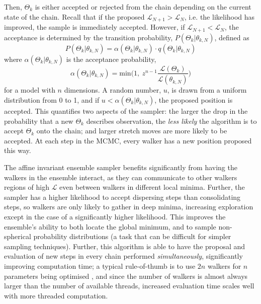 Then, $\Theta_k$ is either accepted or rejected from the chain depending on the current state of the chain. Recall that if the proposed $\mathcal{L}_{N+1} > \mathcal{L}_{N}$, i.e. the likelihood has improved, the sample is immediately accepted. However, if $\mathcal{L}_{N+1} < \mathcal{L}_{N}$, the acceptance is determined by the transition probability, $P(\Theta_k | \theta_{k,N})$, defined as
\begin{equation}
    P(\Theta_k | \theta_{k,N}) = \alpha(\Theta_k | \theta_{k,N}) \cdot q(\Theta_k | \theta_{k,N})
\end{equation}
where $\alpha(\Theta_k | \theta_{k,N})$ is the acceptance probability,
\begin{equation}
    \alpha(\Theta_k | \theta_{k,N}) = \mathrm{min}\bigg( 1,\ z^{n-1}\frac{\mathcal{L}(\Theta_k)}{\mathcal{L}(\theta_{k,N})} \bigg)
\end{equation}
for a model with $n$ dimensions.
A random number, $u$, is drawn from a uniform distribution from 0 to 1, and if $u < \alpha(\Theta_k | \theta_{k,N})$, the proposed position is accepted.
This quantifies two aspects of the sampler: the larger the drop in the probability that a new $\Theta_k$ describes observation, the \textit{less likely} the algorithm is to accept $\Theta_k$ onto the chain; and larger stretch moves are more likely to be accepted.
At each step in the MCMC, every walker has a new position proposed this way.

The affine invariant ensemble sampler benefits significantly from having the walkers in the ensemble interact, as they can communicate to other walkers regions of high $\mathcal{L}$ even between walkers in different local minima. Further, the sampler has a higher likelihood to accept dispersing steps than consolidating steps, so walkers are only likely to gather in deep minima, increasing exploration except in the case of a significantly higher likelihood.
This improves the ensemble's ability to both locate the global minimum, and to sample non-spherical probability distributions (a task that can be difficult for simpler sampling techniques).
Further, this algorithm is able to have the proposal and evaluation of new steps in every chain performed \textit{simultaneously}, significantly improving computation time;
a typical rule-of-thumb is to use $2n$ walkers for $n$ parameters being optimised \citep{goodman2010}, and since the number of walkers is almost always larger than the number of available threads, increased evaluation time scales well with more threaded computation.


